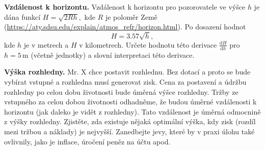 \documentclass{article}
\let\oldtextbf\textbf
\def\textbf#1{%
  \oldtextbf{\color{red} #1}}
\begin{document}
\textbf{Vzdálenost k horizontu.}
Vzdálenost k horizontu pro pozorovatele ve výšce $h$ je dána funkcí $H=\sqrt {2Rh},$ kde $R$ je poloměr Země (\url{https://aty.sdsu.edu/explain/atmos_refr/horizon.html}). Po dosazení hodnot $$H=3.57\sqrt{h},$$ kde $h$ je v metrech a $H$ v kilometrech. Určete hodnotu této derivace $\frac{\mathrm d H}{\mathrm dh}$ pro $h=5\,\mathrm{m}$ (včetně jednotky) a slovní interpretaci této derivace.


\textbf{Výška rozhledny.} Mr. X chce postavit rozhlednu. Bez
dotací a proto se bude vybírat vstupné a rozhledna musí generovat
zisk.  Cena za postavení a údržbu rozhledny po celou dobu životnosti
bude úměrná výšce rozhledny.  Tržby ze vstupného za celou dobou
životnosti odhadněme, že budou úměrné vzdálenosti k horizontu (jak
daleko je vidět z rozhledny). Tato vzdálenost je úměrná odmocnině z
výšky rozhledny. Zjistěte, zda existuje nějaká optimální výška, kdy
zisk (rozdíl mezi tržbou a náklady) je nejvyšší. Zanedbejte jevy, které
by v praxi úlohu také ovlivnily, jako je inflace, úročení peněz na
účtu apod.
\end{document}

